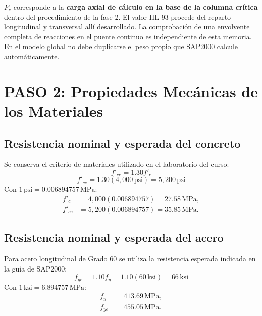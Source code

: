 \documentclass[11pt,a4paper]{article}
\begin{document}
\begin{tcolorbox}[title={Alcance de la carga axial}]
$P_c$ corresponde a la \textbf{carga axial de cálculo en la base de la columna
crítica} dentro del procedimiento de la fase 2. El valor HL-93 procede del
reparto longitudinal y transversal allí desarrollado. La comprobación de una
envolvente completa de reacciones en el puente continuo es independiente de
esta memoria. En el modelo global no debe duplicarse el peso propio que
SAP2000 calcule automáticamente.
\end{tcolorbox}

\section{PASO 2: Propiedades Mecánicas de los Materiales}

\subsection{Resistencia nominal y esperada del concreto}
Se conserva el criterio de materiales utilizado en el laboratorio del curso:
\begin{equation*}
f'_{ce}=1.30f'_c
\end{equation*}
\begin{equation*}
f'_{ce}=1.30(4{,}000\,\mathrm{psi})=\boxed{5{,}200\,\mathrm{psi}}
\end{equation*}
Con $1\,\mathrm{psi}=0.006894757\,\mathrm{MPa}$:
\begin{align*}
f'_c&=4{,}000(0.006894757)=27.58\,\mathrm{MPa},\\
f'_{ce}&=5{,}200(0.006894757)=35.85\,\mathrm{MPa}.
\end{align*}

\subsection{Resistencia nominal y esperada del acero}
Para acero longitudinal de Grado 60 se utiliza la resistencia esperada
indicada en la guía de SAP2000:
\begin{equation*}
f_{ye}=1.10f_y=1.10(60\,\mathrm{ksi})=\boxed{66\,\mathrm{ksi}}
\end{equation*}
Con $1\,\mathrm{ksi}=6.894757\,\mathrm{MPa}$:
\begin{align*}
f_y&=413.69\,\mathrm{MPa},\\
f_{ye}&=455.05\,\mathrm{MPa}.
\end{align*}
\end{document}
